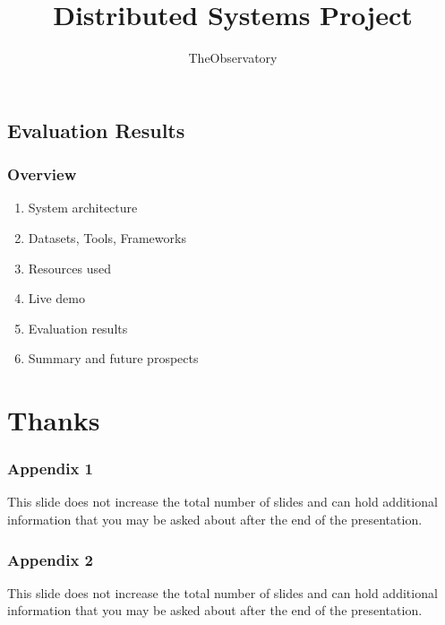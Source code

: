 \documentclass[11pt,t,usepdftitle=false,aspectratio=169]{beamer}
\begin{document}
\subsection{Evaluation Results}

\begin{frame}
	\frametitle{Overview}
	
	
	\bigskip
	\begin{enumerate}
		\item {System architecture}
		\item Datasets, Tools, Frameworks
		\item Resources used
		\item {Live demo}
		\item {Evaluation results}
		\item Summary and future prospects
	\end{enumerate}
	
\end{frame}


\title[TheObservatory]{Distributed Systems Project}
\subtitle{TheObservatory}
\section{Thanks}


\appendix

\begin{frame} %
\frametitle{Appendix 1}
    This slide does not increase the total number of slides and can hold additional information
    that you may be asked about after the end of the presentation.
\end{frame}

\begin{frame}
\frametitle{Appendix 2}
    This slide does not increase the total number of slides and can hold additional information
    that you may be asked about after the end of the presentation.
\end{frame}
\end{document}
